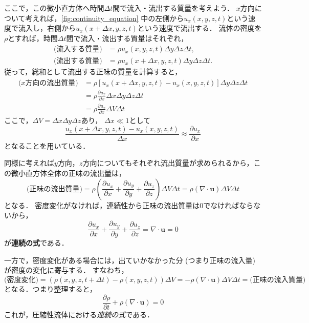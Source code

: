\documentclass[uplatex,dvipdfmx,a4j,11pt]{jsreport}
\newcommand{\keyword}[1]{\textcolor{mainblue}{\textbf{#1}}}
\numberwithin{equation}{chapter}
\begin{document}
ここで，この微小直方体へ時間$\Delta t$間で流入・流出する質量を考えよう．
$x$方向について考えれば，\cref{fig:continuity_equation} 中の左側から$u_x(x,y,z,t)$という速度で流入し，右側から$u_x(x+\Delta x,y,z,t)$という速度で流出する．
流体の密度を$\rho$とすれば，時間$\Delta t$間で流入・流出する質量はそれぞれ，
\begin{align*}
  \text{(流入する質量)} &= \rho u_x(x,y,z,t) \Delta y \Delta z \Delta t,\\
  \text{(流出する質量)} &= \rho u_x(x+\Delta x,y,z,t) \Delta y \Delta z \Delta t.
\end{align*}
従って，総和として流出する正味の質量を計算すると，
\begin{align*}
  \text{($x$方向の流出質量)} &= \rho \left[u_x(x+\Delta x,y,z,t) - u_x(x,y,z,t)\right] \Delta y \Delta z \Delta t \\
  &= \rho \frac{\partial u_x}{\partial x} \Delta x \Delta y \Delta z \Delta t\\
  &= \rho \frac{\partial u_x}{\partial x} \Delta V \Delta t
\end{align*}
ここで，$\Delta V = \Delta x \Delta y \Delta z$あり，
$\Delta x \ll 1$として
\begin{equation*}
  \frac{u_x(x+\Delta x,y,z,t) - u_x(x,y,z,t)}{\Delta x} \approx \frac{\partial u_x}{\partial x}
\end{equation*}
となることを用いている．

同様に考えれば$y$方向，$z$方向についてもそれぞれ流出質量が求められるから，この微小直方体全体の正味の流出量は，
\begin{equation}
  \text{(正味の流出質量)} = \rho \left(\frac{\partial u_x}{\partial x} + \frac{\partial u_y}{\partial y} + \frac{\partial u_z}{\partial z}\right) \Delta V \Delta t = \rho (\nabla \cdot \mathbf{u}) \Delta V \Delta t
\end{equation}
となる．
密度変化がなければ，連続性から正味の流出質量は0でなければならないから，
\begin{equation}
  \frac{\partial u_x}{\partial x} + \frac{\partial u_y}{\partial y} + \frac{\partial u_z}{\partial z} = \nabla \cdot \mathbf{u} = 0
  \label{eq:incompressible_continuity}
\end{equation}
が\keyword{連続の式}である．

一方で，密度変化がある場合には，出ていかなかった分 (つまり正味の流入量) が密度の変化に寄与する．
すなわち，
\begin{equation*}
  \text{(密度変化)} = 
  \left(\rho(x, y, z, t + \Delta t) - \rho(x, y, z, t)\right)\Delta V = -\rho (\nabla \cdot \mathbf{u}) \Delta V \Delta t = \text{(正味の流入質量)}
\end{equation*}
となる．つまり整理すると，
\begin{equation}
  \frac{\partial \rho}{\partial t} + \rho (\nabla \cdot \mathbf{u}) = 0
  \label{eq:compressible_continuity}
\end{equation}
これが，圧縮性流体における\emph{連続の式}である．
\end{document}
